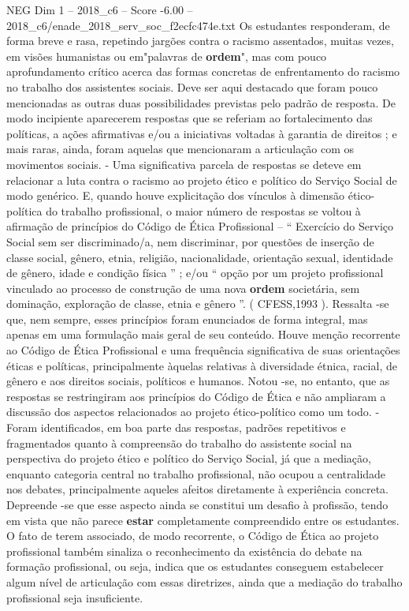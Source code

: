 \begin{textsample}{NEG Dim 1 – 2018\_c6 – Score -6.00 – 2018\_c6/enade\_2018\_serv\_soc\_f2ecfc474e.txt}
Os estudantes responderam, de forma breve e rasa, repetindo jargões contra o racismo assentados, muitas vezes, em visões humanistas ou em"palavras de \textbf{ordem}", mas com pouco aprofundamento crítico acerca das formas concretas de enfrentamento do racismo no trabalho dos assistentes sociais.
Deve ser aqui destacado que foram pouco mencionadas as outras duas possibilidades previstas pelo padrão de resposta.
De modo incipiente aparecerem respostas que se referiam ao fortalecimento das políticas, a ações afirmativas e/ou a iniciativas voltadas à garantia de direitos ; e mais raras, ainda, foram aquelas que mencionaram a articulação com os movimentos sociais. - Uma significativa parcela de respostas se deteve em relacionar a luta contra o racismo ao projeto ético e político do Serviço Social de modo genérico.
E, quando houve explicitação dos vínculos à dimensão ético-política do trabalho profissional, o maior número de respostas se voltou à afirmação de princípios do Código de Ética Profissional – “ Exercício do Serviço Social sem ser discriminado/a, nem discriminar, por questões de inserção de classe social, gênero, etnia, religião, nacionalidade, orientação sexual, identidade de gênero, idade e condição física ” ; e/ou “ opção por um projeto profissional vinculado ao processo de construção de uma nova \textbf{ordem} societária, sem dominação, exploração de classe, etnia e gênero ”. ( CFESS,1993 ).
Ressalta -se que, nem sempre, esses princípios foram enunciados de forma integral, mas apenas em uma formulação mais geral de seu conteúdo.
Houve menção recorrente ao Código de Ética Profissional e uma frequência significativa de suas orientações éticas e políticas, principalmente àquelas relativas à diversidade étnica, racial, de gênero e aos direitos sociais, políticos e humanos.
Notou -se, no entanto, que as respostas se restringiram aos princípios do Código de Ética e não ampliaram a discussão dos aspectos relacionados ao projeto ético-político como um todo. - Foram identificados, em boa parte das respostas, padrões repetitivos e fragmentados quanto à compreensão do trabalho do assistente social na perspectiva do projeto ético e político do Serviço Social, já que a mediação, enquanto categoria central no trabalho profissional, não ocupou a centralidade nos debates, principalmente aqueles afeitos diretamente à experiência concreta.
Depreende -se que esse aspecto ainda se constitui um desafio à profissão, tendo em vista que não parece \textbf{estar} completamente compreendido entre os estudantes.
O fato de terem associado, de modo recorrente, o Código de Ética ao projeto profissional também sinaliza o reconhecimento da existência do debate na formação profissional, ou seja, indica que os estudantes conseguem estabelecer algum nível de articulação com essas diretrizes, ainda que a mediação do trabalho profissional seja insuficiente.

\end{textsample}
